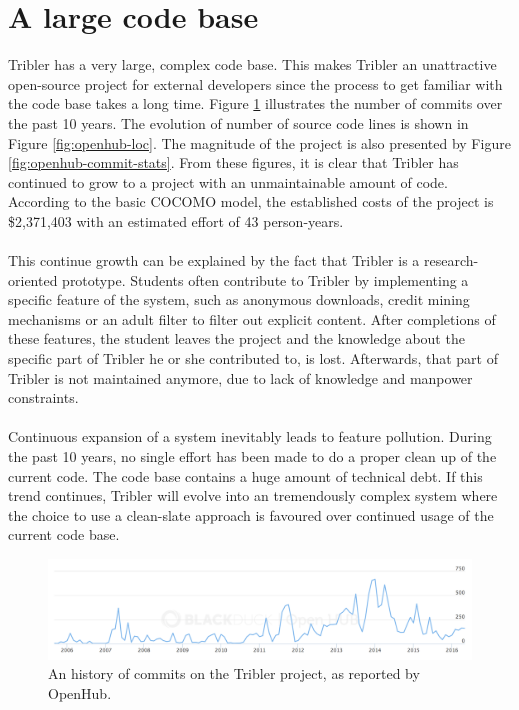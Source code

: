 \section{A large code base}
Tribler has a very large, complex code base. This makes Tribler an unattractive open-source project for external developers since the process to get familiar with the code base takes a long time. Figure \ref{fig:openhub-commits} illustrates the number of commits over the past 10 years. The evolution of number of source code lines is shown in Figure \ref{fig:openhub-loc}. The magnitude of the project is also presented by Figure \ref{fig:openhub-commit-stats}. From these figures, it is clear that Tribler has continued to grow to a project with an unmaintainable amount of code. According to the basic COCOMO model, the established costs of the project is \$2,371,403 with an estimated effort of 43 person-years.\\\\
This continue growth can be explained by the fact that Tribler is a research-oriented prototype. Students often contribute to Tribler by implementing a specific feature of the system, such as anonymous downloads, credit mining mechanisms or an adult filter to filter out explicit content. After completions of these features, the student leaves the project and the knowledge about the specific part of Tribler he or she contributed to, is lost. Afterwards, that part of Tribler is not maintained anymore, due to lack of knowledge and manpower constraints.\\\\
Continuous expansion of a system inevitably leads to feature pollution. During the past 10 years, no single effort has been made to do a proper clean up of the current code. The code base contains a huge amount of technical debt. If this trend continues, Tribler will evolve into an tremendously complex system where the choice to use a clean-slate approach is favoured over continued usage of the current code base.

\begin{figure}[!h]
	\centering
	\includegraphics[width=\columnwidth]{images/openhub_commits}
	\caption{An history of commits on the Tribler project, as reported by OpenHub.}
	\label{fig:openhub-commits}
\end{figure}

